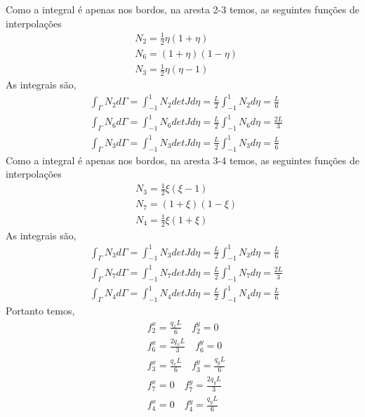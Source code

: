 %
Como a integral é apenas nos bordos, na aresta 2-3 temos, as seguintes funções de interpolações 
%
\begin{equation}
	\begin{split}
		&N_2 = \frac{1}{2} \eta (1 + \eta) \\ 
		&N_6 = (1 + \eta) (1 - \eta) \\ 
		&N_3 = \frac{1}{2} \eta (\eta - 1)  
	\end{split}
\end{equation}
%
As integrais são,
\begin{equation}
	\begin{split}
		&\int_{\Gamma} N_2 d\Gamma = \int_{-1}^{1} N_2 det J d\eta = \frac{L}{2} \int_{-1}^{1} N_2 d\eta =  \frac{L}{6}\\
		&\int_{\Gamma} N_6 d\Gamma = \int_{-1}^{1} N_6 det J d\eta = \frac{L}{2} \int_{-1}^{1} N_6 d\eta =  \frac{2 L}{3}\\
		&\int_{\Gamma} N_3 d\Gamma = \int_{-1}^{1} N_3 det J d\eta = \frac{L}{2} \int_{-1}^{1} N_3 d\eta =  \frac{L}{6}
	\end{split}
\end{equation}
Como a integral é apenas nos bordos, na aresta 3-4 temos, as seguintes funções de interpolações 
%
\begin{equation}
	\begin{split}
		&N_3 = \frac{1}{2} \xi (\xi - 1) \\ 
		&N_7 = (1 + \xi) (1 - \xi) \\ 
		&N_4 = \frac{1}{2} \xi (1 + \xi)  
	\end{split}
\end{equation}
%
As integrais são,
\begin{equation}
	\begin{split}
		&\int_{\Gamma} N_3 d\Gamma = \int_{-1}^{1} N_3 det J d\eta = \frac{L}{2} \int_{-1}^{1} N_3 d\eta =  \frac{L}{6}\\
		&\int_{\Gamma} N_7 d\Gamma = \int_{-1}^{1} N_7 det J d\eta = \frac{L}{2} \int_{-1}^{1} N_7 d\eta =  \frac{2 L}{3}\\
		&\int_{\Gamma} N_4 d\Gamma = \int_{-1}^{1} N_4 det J d\eta = \frac{L}{2} \int_{-1}^{1} N_4 d\eta =  \frac{L}{6}
	\end{split}
\end{equation}
%
Portanto temos,
%
\begin{equation}
	\begin{split}
		&f^x_2 = \frac{q_x L}{6} \quad f^y_2 = 0\\
		&f^x_6 = \frac{2 q_x L}{3} \quad f^y_6 = 0\\
		&f^x_3 = \frac{q_x L}{6} \quad f^y_3 = \frac{q_y L}{6}\\
		&f^x_7 = 0 \quad f^y_7 = \frac{2 q_y L}{3}\\
		&f^x_4 = 0 \quad f^y_4 = \frac{q_y L}{6}
	\end{split}
\end{equation}
